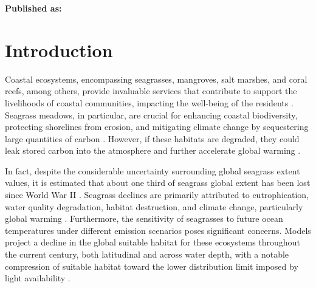 \vspace{3cm}





\textbf{Published as:}

\vspace{0.5cm}


\newpage
\section{Introduction}

Coastal ecosystems, encompassing seagrasses, mangroves, salt marshes, and coral
reefs, among others, provide invaluable services that contribute to support the
livelihoods of coastal communities, impacting the well-being of the residents
\cite{MEA2005,IUCN2008}. Seagrass meadows, in particular, are crucial for
enhancing coastal biodiversity, protecting shorelines from erosion, and
mitigating climate change by sequestering large quantities of carbon
\cite{DuarteNCC2013,Mcleod2011}. However, if these habitats are degraded, they
could leak stored carbon into the atmosphere and further accelerate global
warming \cite{DuarteNCC2013,Macreadie2014}.

In fact, despite the considerable uncertainty surrounding global seagrass
extent values, it is estimated that about one third of seagrass global extent
has been lost since World War II \cite{DuarteNCC2013}. Seagrass declines are
primarily attributed to eutrophication, water quality degradation, habitat
destruction, and climate change, particularly global warming
\cite{Waycott2009}. Furthermore, the
sensitivity of seagrasses to future ocean temperatures under different emission
scenarios poses significant concerns. Models project a decline in the global
suitable habitat for these ecosystems throughout the current century, both
latitudinal and across water depth, with a notable compression of suitable
habitat toward the lower distribution limit imposed by light availability
\cite{Jorda2020}.

